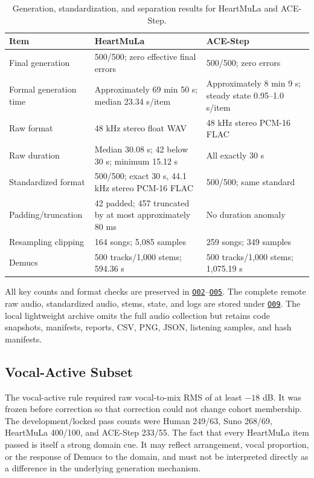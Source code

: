 \documentclass[11pt,a4paper]{article}
\newcommand{\outref}[1]{\hyperlink{output:#1}{\texttt{#1}}}
\begin{document}
\begin{table}[H]
\centering
\small
\caption{Generation, standardization, and separation results for HeartMuLa and ACE-Step.}
\label{tab:generation-qc}
\begin{tabularx}{\linewidth}{lXX}
\toprule
Item & HeartMuLa & ACE-Step \\
\midrule
Final generation & 500/500; zero effective final errors & 500/500; zero errors \\
Formal generation time & Approximately 69 min 50 s; median 23.34 s/item & Approximately 8 min 9 s; steady state 0.95--1.0 s/item \\
Raw format & 48 kHz stereo float WAV & 48 kHz stereo PCM-16 FLAC \\
Raw duration & Median 30.08 s; 42 below 30 s; minimum 15.12 s & All exactly 30 s \\
Standardized format & 500/500; exact 30 s, 44.1 kHz stereo PCM-16 FLAC & 500/500; same standard \\
Padding/truncation & 42 padded; 457 truncated by at most approximately 80 ms & No duration anomaly \\
Resampling clipping & 164 songs; 5,085 samples & 259 songs; 349 samples \\
Demucs & 500 tracks/1,000 stems; 594.36 s & 500 tracks/1,000 stems; 1,075.19 s \\
\bottomrule
\end{tabularx}
\end{table}

All key counts and format checks are preserved in \outref{O02}--\outref{O05}. The complete remote raw audio, standardized audio, stems, state, and logs are stored under \outref{O09}. The local lightweight archive omits the full audio collection but retains code snapshots, manifests, reports, CSV, PNG, JSON, listening samples, and hash manifests.

\subsection{Vocal-Active Subset}

The vocal-active rule required raw vocal-to-mix RMS of at least $-18$ dB. It was frozen before correction so that correction could not change cohort membership. The development/locked pass counts were Human 249/63, Suno 268/69, HeartMuLa 400/100, and ACE-Step 233/55. The fact that every HeartMuLa item passed is itself a strong domain cue. It may reflect arrangement, vocal proportion, or the response of Demucs to the domain, and must not be interpreted directly as a difference in the underlying generation mechanism.
\end{document}
